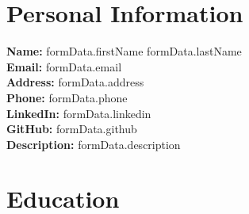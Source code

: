 \documentclass{article}
\begin{document}
\section*{Personal Information}
\textbf{Name:} {{ formData.firstName }} {{ formData.lastName }} \\
\textbf{Email:} {{ formData.email }} \\
\textbf{Address:} {{ formData.address }} \\
\textbf{Phone:} {{ formData.phone }} \\
\textbf{LinkedIn:} {{ formData.linkedin }} \\
\textbf{GitHub:} {{ formData.github }} \\
\textbf{Description:} {{ formData.description }} \\

\section*{Education}
\end{document}
